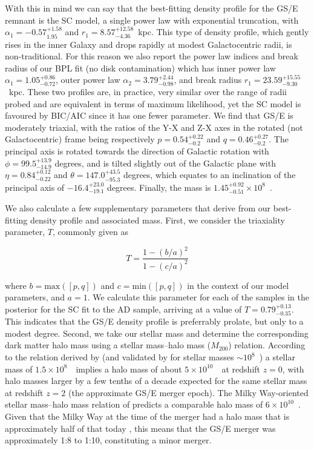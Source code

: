 With this in mind we can say that the best-fitting density profile for the GS/E remnant is the SC model, a single power law with exponential truncation, with $\alpha_{1} = -0.57^{+1.58}_{1.95}$ and $r_{1} = 8.57^{+12.58}_{-4.36}$~kpc. This type of density profile, which gently rises in the inner Galaxy and drops rapidly at modest Galactocentric radii, is non-traditional. For this reason we also report the power law indices and break radius of our BPL fit (no disk contamination) which has inner power law $\alpha_{1} = 1.05^{+0.86}_{-0.72}$, outer power law $\alpha_{2} = 3.79^{+2.44}_{-0.98}$, and break radius $r_{1} = 23.59^{+15.55}_{-9.30}$~kpc. These two profiles are, in practice, very similar over the range of radii probed and are equivalent in terms of maximum likelihood, yet the SC model is favoured by BIC/AIC since it has one fewer parameter. We find that GS/E is moderately triaxial, with the ratios of the Y-X and Z-X axes in the rotated (not Galactocentric) frame being respectively $p = 0.54^{+0.22}_{-0.2}$ and $q = 0.46^{+0.27}_{-0.2}$. The principal axis is rotated towards the direction of Galactic rotation with $\phi = 99.5^{+13.9}_{-14.9}$ degrees, and is tilted slightly out of the Galactic plane with $\eta=0.84^{+0.12}_{-0.22}$ and $\theta = 147.0^{+43.5}_{-95.3}$ degrees, which equates to an inclination of the principal axis of $-16.4^{+23.0}_{-19.1}$ degrees. Finally, the mass is $1.45^{+0.92}_{-0.51}\times10^{8}$~\Msun. 

We also calculate a few supplementary parameters that derive from our best-fitting density profile and associated mass. First, we consider the triaxiality parameter, $T$, commonly given as

\begin{equation}
    T = \frac{1-(b/a)^{2}}{1-(c/a)^{2}}
\end{equation}

\noindent where $b = \mathrm{max}([p,q])$ and $c = \mathrm{min}([p,q])$ in the context of our model parameters, and $a=1$. We calculate this parameter for each of the samples in the posterior for the SC fit to the AD sample, arriving at a value of $T=0.79^{+0.13}_{-0.35}$. This indicates that the GS/E density profile is preferrably prolate, but only to a modest degree. Second, we take our stellar mass and determine the corresponding dark matter halo mass using a stellar mass--halo mass ($M_{200}$) relation. According to the relation derived by \textcite{behroozi13} (and validated by \textcite{read17} for stellar masses $\sim10^{8}$~\Msun) a stellar mass of $1.5\times10^{8}$~\Msun\ implies a halo mass of about $5\times10^{10}$~\Msun\ at redshift $z=0$, with halo masses larger by a few tenths of a decade expected for the same stellar mass at redshift $z=2$ (the approximate GS/E merger epoch). The Milky Way-oriented stellar mass--halo mass relation of \textcite{nadler20} predicts a comparable halo mass of $6\times10^{10}$~\Msun. Given that the Milky Way at the time of the merger had a halo mass that is approximately half of that today \parencite[so $\approx 5\times 10^{11}$~\Msun; e.g.][]{mackereth18a}, this means that the GS/E merger was approximately 1:8 to 1:10, constituting a minor merger.

